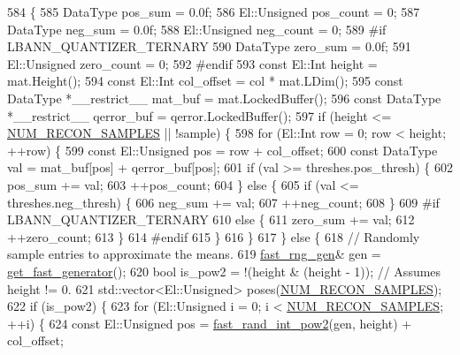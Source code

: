 \begin{DoxyCode}
584                                                    \{
585   DataType pos\_sum = 0.0f;
586   El::Unsigned pos\_count = 0;
587   DataType neg\_sum = 0.0f;
588   El::Unsigned neg\_count = 0;
589 \textcolor{preprocessor}{#if LBANN\_QUANTIZER\_TERNARY}
590   DataType zero\_sum = 0.0f;
591   El::Unsigned zero\_count = 0;
592 \textcolor{preprocessor}{#endif}
593   \textcolor{keyword}{const} El::Int height = mat.Height();
594   \textcolor{keyword}{const} El::Int col\_offset = col * mat.LDim();
595   \textcolor{keyword}{const} DataType *\_\_restrict\_\_ mat\_buf = mat.LockedBuffer();
596   \textcolor{keyword}{const} DataType *\_\_restrict\_\_ qerror\_buf = qerror.LockedBuffer();
597   \textcolor{keywordflow}{if} (height <= \hyperlink{classlbann_1_1lbann__quantizer_a10667e56db4218aac3912c6bae28fc41}{NUM\_RECON\_SAMPLES} || !sample) \{
598     \textcolor{keywordflow}{for} (El::Int row = 0; row < height; ++row) \{
599       \textcolor{keyword}{const} El::Unsigned pos = row + col\_offset;
600       \textcolor{keyword}{const} DataType val = mat\_buf[pos] + qerror\_buf[pos];
601       \textcolor{keywordflow}{if} (val >= threshes.pos\_thresh) \{
602         pos\_sum += val;
603         ++pos\_count;
604       \} \textcolor{keywordflow}{else} \{
605         \textcolor{keywordflow}{if} (val <= threshes.neg\_thresh) \{
606           neg\_sum += val;
607           ++neg\_count;
608         \}
609 \textcolor{preprocessor}{#if LBANN\_QUANTIZER\_TERNARY}
610         \textcolor{keywordflow}{else} \{
611           zero\_sum += val;
612           ++zero\_count;
613         \}
614 \textcolor{preprocessor}{#endif}
615       \}
616     \}
617   \} \textcolor{keywordflow}{else} \{
618     \textcolor{comment}{// Randomly sample entries to approximate the means.}
619     \hyperlink{namespacelbann_af16616ffa6a3616836eabadd6ce837ec}{fast\_rng\_gen}& gen = \hyperlink{namespacelbann_ae6ce9c2fdec6f81803f6b1a6555c31c5}{get\_fast\_generator}();
620     \textcolor{keywordtype}{bool} is\_pow2 = !(height & (height - 1));  \textcolor{comment}{// Assumes height != 0.}
621     std::vector<El::Unsigned> poses(\hyperlink{classlbann_1_1lbann__quantizer_a10667e56db4218aac3912c6bae28fc41}{NUM\_RECON\_SAMPLES});
622     \textcolor{keywordflow}{if} (is\_pow2) \{
623       \textcolor{keywordflow}{for} (El::Unsigned i = 0; i < \hyperlink{classlbann_1_1lbann__quantizer_a10667e56db4218aac3912c6bae28fc41}{NUM\_RECON\_SAMPLES}; ++i) \{
624         \textcolor{keyword}{const} El::Unsigned pos = \hyperlink{namespacelbann_a2fe8cea17a147566b73260f557b51006}{fast\_rand\_int\_pow2}(gen, height) + col\_offset;

\end{DoxyCode}
